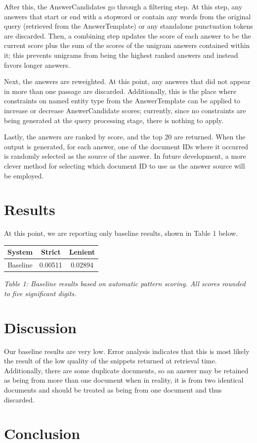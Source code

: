 \documentclass[11pt]{article}
\begin{document}
After this, the AnswerCandidates go through a filtering step.  At this step, any answers that start or end with a stopword or contain any words from the original query (retrieved from the AnswerTemplate) or any standalone punctuation tokens are discarded.  Then, a combining step updates the score of each answer to be the current score plus the sum of the scores of the unigram answers contained within it; this prevents unigrams from being the highest ranked answers and instead favors longer answers.

Next, the answers are reweighted.  At this point, any answers that did not appear in more than one passage are discarded.  Additionally, this is the place where constraints on named entity type from the AnswerTemplate can be applied to increase or decrease AnswerCandidate scores; currently, since no constraints are being generated at the query processing stage, there is nothing to apply.

Lastly, the answers are ranked by score, and the top 20 are returned.  When the output is generated, for each answer, one of the document IDs where it occurred is randomly selected as the source of the answer.  In future development, a more clever method for selecting which document ID to use as the answer source will be employed.

\section{Results}

At this point, we are reporting only baseline results, shown in Table 1 below.

\vspace{5mm}
{\centering
\begin{tabular}{|c|c|c|}
\hline
\textbf{System} & \textbf{Strict} & \textbf{Lenient} \\ \hline
Baseline & 0.00511 & 0.02894 \\ \hline
\end{tabular}

\vspace{1mm}
\emph{Table 1: Baseline results based on automatic pattern scoring. All scores rounded to five significant digits.}
\par}

\section{Discussion}

Our baseline results are very low.  Error analysis indicates that this is most likely the result of the low quality of the snippets returned at retrieval time.  Additionally, there are some duplicate documents, so an answer may be retained as being from more than one document when in reality, it is from two identical documents and should be treated as being from one document and thus discarded.

\section{Conclusion}

\nocite{*}




\end{document}
